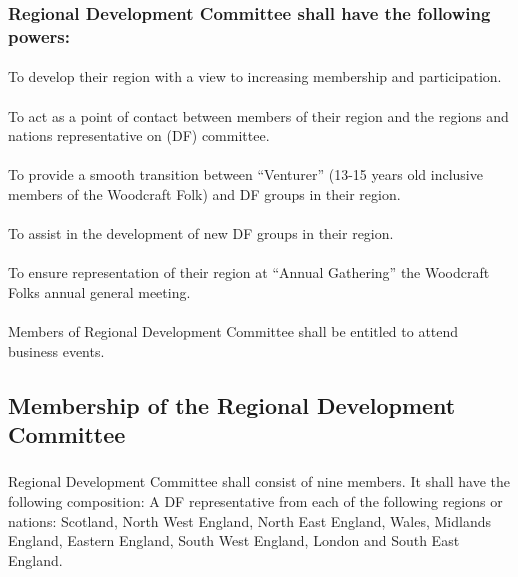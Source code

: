 \documentclass[a4paper, 12pt]{article}
\begin{document}
\subsubsection{Regional Development Committee shall have the following powers:}
\paragraph{}
To develop their region with a view to increasing membership and participation.
\paragraph{}
To act as a point of contact between members of their region and the regions and nations representative on (DF) committee.
\paragraph{}
To provide a smooth transition between ``Venturer'' (13-15 years old inclusive members of the Woodcraft Folk) and DF groups in their region.
\paragraph{}
To assist in the development of new DF groups in their region.
\paragraph{}
To ensure representation of their region at ``Annual Gathering'' the Woodcraft Folks annual general meeting.
\paragraph{}
Members of Regional Development Committee shall be entitled to attend business events.

\subsection{Membership of the Regional Development Committee}
\label{sec:rdcmembership}
\subsubsection{}
Regional Development Committee shall consist of nine members. It shall have the following composition: A DF representative from each of the following regions or nations: Scotland, North West England, North East England, Wales, Midlands England, Eastern England, South West England, London and South East England.
\end{document}
